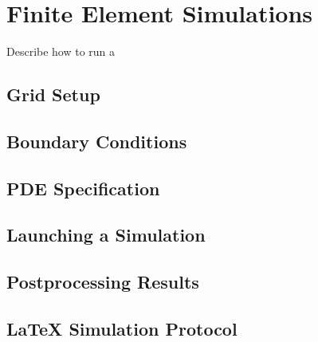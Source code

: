 
\chapter{Finite Element Simulations}  \label{chap:fem}

Describe how to run a 

\section{Grid Setup}


\section{Boundary Conditions}


\section{PDE Specification}


\section{Launching a Simulation}


\section{Postprocessing Results}



\section{{\LaTeX} Simulation Protocol}



